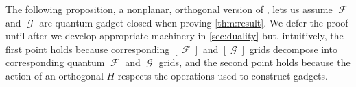 \documentclass{theoretics}
\makeatletter
\DeclareMathOperator{\fc}{\mathcal{F}}
\DeclareMathOperator{\gc}{\mathcal{G}}
\newcommand\IfRestateTF{%
  \ifx\label\thmt@gobble@label %
    \expandafter\@firstoftwo
  \else
    \expandafter\@secondoftwo
  \fi
}
\newcommand{\RestateRemark}{\IfRestateTF{{\normalfont\bfseries (Restated) }}{}}
\makeatother
\begin{document}
The following proposition, a
nonplanar, orthogonal version of \cite[Lemmas 31 and 32]{cai_planar_2023}, lets us assume
$\fc$ and $\gc$ are quantum-gadget-closed when proving \autoref{thm:result}.
We defer the proof until after we develop appropriate machinery in \autoref{sec:duality} but,
intuitively, the first point holds because corresponding $[\fc]$ and $[\gc]$ grids decompose
into corresponding quantum $\fc$ and $\gc$ grids, and the second point holds because
the action of an orthogonal $H$ respects the operations used to construct gadgets.

\end{document}
